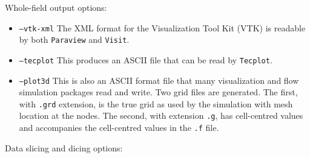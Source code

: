 Whole-field output options:
\begin{itemize}
  \item \texttt{--vtk-xml} The XML format for the Visualization Tool Kit (VTK) is readable by both \texttt{Paraview}
     and \texttt{Visit}.
  \item \texttt{--tecplot} This produces an ASCII file that can be read by \texttt{Tecplot}.
  \item \texttt{--plot3d} This is also an ASCII format file that many visualization and flow simulation
     packages read and write.
     Two grid files are generated.  The first, with \texttt{.grd} extension, 
     is the true grid as used by the simulation with mesh location at the nodes.  
     The second, with extension \texttt{.g}, has cell-centred values and accompanies 
     the cell-centred values in the \texttt{.f} file.
\end{itemize}
Data slicing and dicing options:
